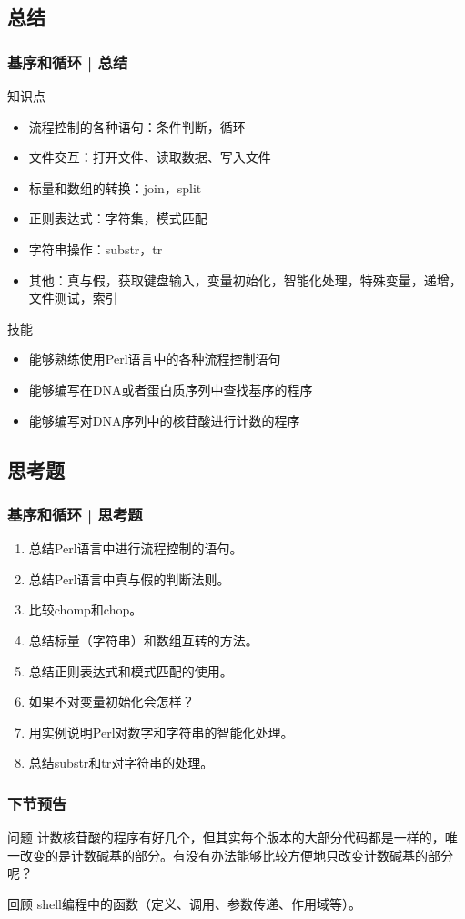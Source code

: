 \subsection{总结}
\begin{frame}
  \frametitle{基序和循环 | 总结}
  \begin{block}{知识点}
    \begin{itemize}
      \item 流程控制的各种语句：条件判断，循环
      \item 文件交互：打开文件、读取数据、写入文件
      \item 标量和数组的转换：join，split
      \item 正则表达式：字符集，模式匹配
      \item 字符串操作：substr，tr
      \item 其他：真与假，获取键盘输入，变量初始化，智能化处理，特殊变量，递增，文件测试，索引
    \end{itemize}
  \end{block}
  \pause
  \begin{block}{技能}
    \begin{itemize}
      \item 能够熟练使用Perl语言中的各种流程控制语句
      \item 能够编写在DNA或者蛋白质序列中查找基序的程序
      \item 能够编写对DNA序列中的核苷酸进行计数的程序
    \end{itemize}
  \end{block}
\end{frame}

\subsection{思考题}
\begin{frame}
  \frametitle{基序和循环 | 思考题}
  \begin{enumerate}
    \item 总结Perl语言中进行流程控制的语句。
    \item 总结Perl语言中真与假的判断法则。
    \item 比较chomp和chop。
    \item 总结标量（字符串）和数组互转的方法。
    \item 总结正则表达式和模式匹配的使用。
    \item 如果不对变量初始化会怎样？
    \item 用实例说明Perl对数字和字符串的智能化处理。
    \item 总结substr和tr对字符串的处理。
  \end{enumerate}
\end{frame}

\begin{frame}
  \frametitle{下节预告}
  \begin{block}{问题}
 计数核苷酸的程序有好几个，但其实每个版本的大部分代码都是一样的，唯一改变的是计数碱基的部分。有没有办法能够比较方便地只改变计数碱基的部分呢？ 
  \end{block}
  \begin{block}{回顾}
 shell编程中的函数（定义、调用、参数传递、作用域等）。 
  \end{block}
\end{frame}



